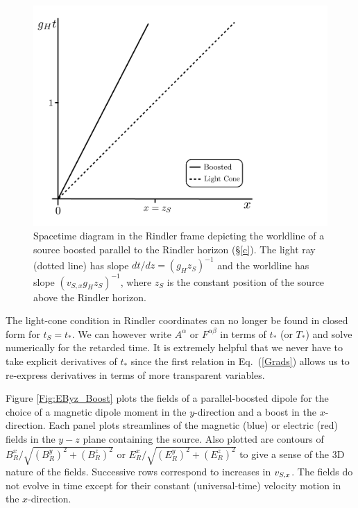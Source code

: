 \begin{figure}
\begin{center}
\includegraphics[scale=0.4]{figures/ch6/Boost_stDiagram.pdf} 
\end{center}
\caption{Spacetime diagram in the Rindler frame depicting the worldline of a source boosted parallel to the Rindler horizon (\S\ref{c}). The light ray (dotted line) has slope $dt/dz = (g_Hz_S)^{-1}$ and the worldline has slope $(v_{S,x} g_Hz_S)^{-1}$, where $z_S$ is the constant position of the source above the Rindler horizon.}
\label{ST_Boost}
\end{figure}

The light-cone condition in Rindler coordinates can no longer be
found in closed form for $t_S=t_*$. We can however
write $A^{\alpha}$ or $F^{\alpha \beta}$ in terms of $t_*$ (or $T_*$)
and solve numerically for the retarded time.  
It is extremely helpful that we never have to take explicit
derivatives of $t_*$ since the first relation in Eq.\ (\ref{Grads}) allows us to
re-express derivatives in terms of more transparent variables.

Figure \ref{Fig:EByz_Boost} plots the fields of a parallel-boosted dipole for
the choice of a magnetic dipole moment in the $y$-direction and a boost in
the $x$-direction. Each panel plots streamlines of the magnetic (blue)
or electric (red) fields in the $y-z$ plane containing the source. Also 
plotted are contours of $B^x_R/ \sqrt{(B^y_R)^2 + (B^z_R)^2}$
or $E^x_R/\sqrt{(E^y_R)^2 + (E^z_R)^2}$ to give a sense of 
the 3D nature of the fields. Successive rows correspond to increases in $v_{S, x}$.  The fields 
do not evolve in time except for their constant (universal-time) velocity motion in the $x$-direction. 

